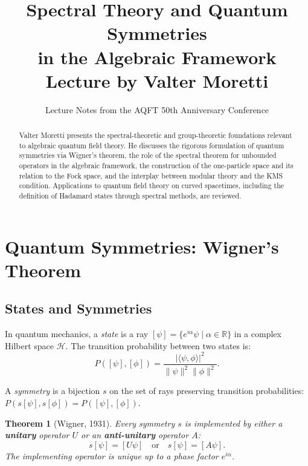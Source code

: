 \documentclass[11pt,a4paper]{article}
\title{\textbf{Spectral Theory and Quantum Symmetries\\in the Algebraic Framework}\\[6pt]
\large Lecture by Valter Moretti}
\author{Lecture Notes from the AQFT 50th Anniversary Conference}
\date{}
\newtheorem{theorem}{Theorem}[section]
\begin{document}
\maketitle

\begin{abstract}
Valter Moretti presents the spectral-theoretic and group-theoretic foundations
relevant to algebraic quantum field theory. He discusses the rigorous formulation
of quantum symmetries via Wigner's theorem, the role of the spectral theorem for
unbounded operators in the algebraic framework, the construction of the one-particle
space and its relation to the Fock space, and the interplay between modular theory
and the KMS condition. Applications to quantum field theory on curved spacetimes,
including the definition of Hadamard states through spectral methods, are reviewed.
\end{abstract}

\tableofcontents

\section{Quantum Symmetries: Wigner's Theorem}

\subsection{States and Symmetries}

In quantum mechanics, a \emph{state} is a ray $[\psi] = \{e^{i\alpha}\psi \mid
\alpha \in \mathbb{R}\}$ in a complex Hilbert space $\mathcal{H}$. The transition
probability between two states is:
\begin{equation}
  P([\psi], [\phi]) = \frac{|\langle \psi, \phi \rangle|^2}
  {\|\psi\|^2 \|\phi\|^2}.
\end{equation}

A \emph{symmetry} is a bijection $s$ on the set of rays preserving
transition probabilities: $P(s[\psi], s[\phi]) = P([\psi], [\phi])$.

\begin{theorem}[Wigner, 1931]
Every symmetry $s$ is implemented by either a \textbf{unitary} operator
$U$ or an \textbf{anti-unitary} operator $A$:
\[
  s[\psi] = [U\psi] \quad\text{or}\quad s[\psi] = [A\psi].
\]
The implementing operator is unique up to a phase factor $e^{i\alpha}$.
\end{theorem}
\end{document}
